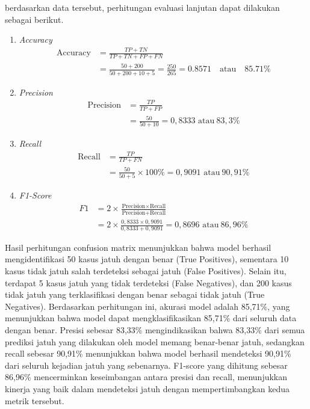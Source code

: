 berdasarkan data tersebut, perhitungan evaluasi lanjutan dapat dilakukan sebagai berikut.

\begin{enumerate}
    \item \textit{Accuracy}
    \vspace{20pt} 
    \begin{align*}
        \text{Accuracy} &= \frac{TP + TN}{TP + TN + FP + FN} \\
        &= \frac{50 + 200}{50 + 200 + 10 + 5} = \frac{250}{265} = 0.8571 \quad \text{atau} \quad 85.71\%
    \end{align*}
    
    \item \textit{Precision}
    \vspace{20pt} 
    \begin{align*}
        \text{Precision} &= \frac{TP}{TP + FP} \\
        &= \frac{50}{50 + 10} = 0,8333 \text{ atau}\ 83,3\%
    \end{align*}
    
    \item \textit{Recall}
    \vspace{20pt} 
    \begin{align*} 
        \text{Recall} &= \frac{TP}{TP + FN} \\ 
        &= \frac{50}{50 + 5} \times 100\% = 0,9091 \text{ atau}\ 90,91\%
    \end{align*}
    
    
    \item \textit{F1-Score}
    \vspace{20pt}
    \begin{align*}
        F1 &= 2 \times \frac{\text{Precision} \times \text{Recall}}{\text{Precision} + \text{Recall}} \\ 
        &= 2 \times \frac{0,8333 \times 0,9091}{0,8333 + 0,9091} = 0,8696 \text{ atau}\ 86,96\% 
    \end{align*}
\end{enumerate} 

\vspace{10pt}

Hasil perhitungan confusion matrix menunjukkan bahwa model berhasil mengidentifikasi 50 kasus jatuh dengan benar (True Positives), sementara 10 kasus tidak jatuh salah terdeteksi sebagai jatuh (False Positives). Selain itu, terdapat 5 kasus jatuh yang tidak terdeteksi (False Negatives), dan 200 kasus tidak jatuh yang terklasifikasi dengan benar sebagai tidak jatuh (True Negatives). Berdasarkan perhitungan ini, akurasi model adalah 85,71\%, yang menunjukkan bahwa model dapat mengklasifikasikan 85,71\% dari seluruh data dengan benar. Presisi sebesar 83,33\% mengindikasikan bahwa 83,33\% dari semua prediksi jatuh yang dilakukan oleh model memang benar-benar jatuh, sedangkan recall sebesar 90,91\% menunjukkan bahwa model berhasil mendeteksi 90,91\% dari seluruh kejadian jatuh yang sebenarnya. F1-score yang dihitung sebesar 86,96\% mencerminkan keseimbangan antara presisi dan recall, menunjukkan kinerja yang baik dalam mendeteksi jatuh dengan mempertimbangkan kedua metrik tersebut.

